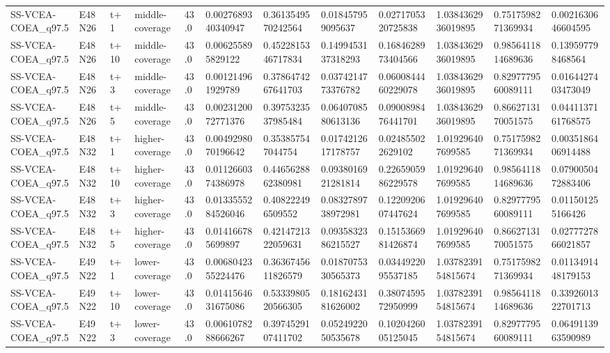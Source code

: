 \begin{landscape}
\begin{longtable}{llllllllllll}
SS-VCEA-COEA\_q97.5 & E48N26 & t+1 & middle-coverage & 43.0 & 0.0027689340340947 & 0.3613549570242564 & 0.018457959095637 & 0.0271705320725838 & 1.0384362936019895 & 0.7517598271369934 & 0.0021630646604595 \\
SS-VCEA-COEA\_q97.5 & E48N26 & t+10 & middle-coverage & 43.0 & 0.006255895829122 & 0.4522815346717834 & 0.1499453137318293 & 0.1684628973404566 & 1.0384362936019895 & 0.9856411814689636 & 0.139597798468564 \\
SS-VCEA-COEA\_q97.5 & E48N26 & t+3 & middle-coverage & 43.0 & 0.001214961929789 & 0.3786474267641703 & 0.0374214773376782 & 0.0600844460229078 & 1.0384362936019895 & 0.8297779560089111 & 0.0164427403473049 \\
SS-VCEA-COEA\_q97.5 & E48N26 & t+5 & middle-coverage & 43.0 & 0.0023120072771376 & 0.3975323537985484 & 0.0640708580613136 & 0.0900898476441701 & 1.0384362936019895 & 0.8662713170051575 & 0.0441137161768575 \\
SS-VCEA-COEA\_q97.5 & E48N32 & t+1 & higher-coverage & 43.0 & 0.0049298070196642 & 0.353857547044754 & 0.0174212617178757 & 0.024855022629102 & 1.019296407699585 & 0.7517598271369934 & 0.0035186406914488 \\
SS-VCEA-COEA\_q97.5 & E48N32 & t+10 & higher-coverage & 43.0 & 0.0112660374386978 & 0.4465628862380981 & 0.0938016921281814 & 0.2265905986229578 & 1.019296407699585 & 0.9856411814689636 & 0.0790050472883406 \\
SS-VCEA-COEA\_q97.5 & E48N32 & t+3 & higher-coverage & 43.0 & 0.0133555284526046 & 0.408222496509552 & 0.0832789738972981 & 0.1220920607447624 & 1.019296407699585 & 0.8297779560089111 & 0.011501255166426 \\
SS-VCEA-COEA\_q97.5 & E48N32 & t+5 & higher-coverage & 43.0 & 0.014166785699897 & 0.4214721322059631 & 0.0935832386215527 & 0.1515366981426874 & 1.019296407699585 & 0.8662713170051575 & 0.0277727866021857 \\
SS-VCEA-COEA\_q97.5 & E49N22 & t+1 & lower-coverage & 43.0 & 0.0068042355224476 & 0.3636745611826579 & 0.0187075330565373 & 0.0344922095537185 & 1.0378239154815674 & 0.7517598271369934 & 0.0113491448179153 \\
SS-VCEA-COEA\_q97.5 & E49N22 & t+10 & lower-coverage & 43.0 & 0.0141564631675086 & 0.5333980520566305 & 0.1816243181626002 & 0.3807459572950999 & 1.0378239154815674 & 0.9856411814689636 & 0.3392601322701713 \\
SS-VCEA-COEA\_q97.5 & E49N22 & t+3 & lower-coverage & 43.0 & 0.0061078288666267 & 0.3974529107411702 & 0.0524922050535678 & 0.1020426005125045 & 1.0378239154815674 & 0.8297779560089111 & 0.0649113963590989 \\

\end{longtable}
\end{landscape}
